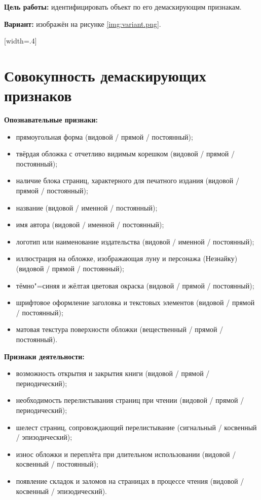 \documentclass{bsuir}
\begin{document}
\maketitle
\mainmatter

\textbf{Цель работы:} идентифицировать объект по его демаскирующим признакам.

\textbf{Вариант:} изображён на рисунке \ref{img:variant.png}.

[width=.4\textwidth]

\section{Совокупность демаскирующих признаков}

\textbf{Опознавательные признаки:}

\begin{itemize}
	\item прямоугольная форма (видовой / прямой / постоянный);
	\item твёрдая обложка с отчетливо видимым корешком (видовой / прямой / постоянный);
	\item наличие блока страниц, характерного для печатного издания (видовой / прямой / постоянный);
	\item название  (видовой / именной / постоянный);
	\item имя автора  (видовой / именной / постоянный);
	\item логотип или наименование издательства  (видовой / именной / постоянный);
	\item иллюстрация на обложке, изображающая луну и персонажа (Незнайку) (видовой / прямой / постоянный);
	\item тёмно"=синяя и жёлтая цветовая окраска (видовой / прямой / постоянный);
	\item шрифтовое оформление заголовка и текстовых элементов (видовой / прямой / постоянный);
	\item матовая текстура поверхности обложки (вещественный / прямой / постоянный).
\end{itemize}

\textbf{Признаки деятельности:}

\begin{itemize}
	\item возможность открытия и закрытия книги (видовой / прямой / периодический);
	\item необходимость перелистывания страниц при чтении (видовой / прямой / периодический);
	\item шелест страниц, сопровождающий перелистывание (сигнальный / косвенный / эпизодический);
	\item износ обложки и переплёта при длительном использовании (видовой / косвенный / постоянный);
	\item появление складок и заломов на страницах в процессе чтения (видовой / косвенный / эпизодический).
\end{itemize}
\end{document}
